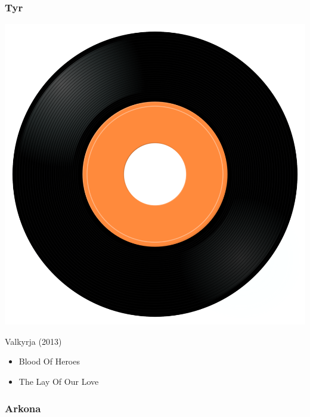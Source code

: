 \subsubsection{Tyr}

\begin{minipage}[t]{0.25\textwidth}
\captionsetup{type=figure}
\includegraphics[width=\textwidth]{Images/cover.png}
\caption*{Valkyrja (2013)}
\end{minipage}
\begin{minipage}[t]{0.25\textwidth}\vspace{0pt}
\begin{itemize}[nosep,leftmargin=1em,labelwidth=*,align=left]
	\setlength{\itemsep}{0pt}
	\item Blood Of Heroes
	\item The Lay Of Our Love
\end{itemize}
\end{minipage}

\subsubsection{Arkona}

